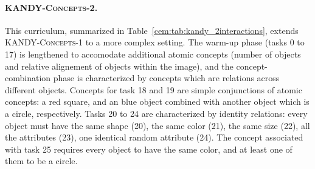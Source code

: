 \paragraph{\textsc{KANDY-Concepts-2}.}
This curriculum, summarized in Table~\ref{cem:tab:kandy_2interactions}, extends \textsc{KANDY-Concepts-1} to a more complex setting. The warm-up phase (tasks 0 to 17) is lengthened to accomodate additional atomic concepts (number of objects and relative alignement of objects within the image), and the concept-combination phase is characterized by concepts which are relations across different objects.
Concepts for task 18 and 19 are simple conjunctions of atomic concepts: a red square, and an blue object combined with another object which is a circle, respectively. Tasks 20 to 24 are characterized by identity relations: every object must have the same shape (20), the same color (21), the same size (22), all the attributes (23), one identical random attribute (24).
The concept associated with task 25 requires every object to have the same color, and at least one of them to be a circle.

